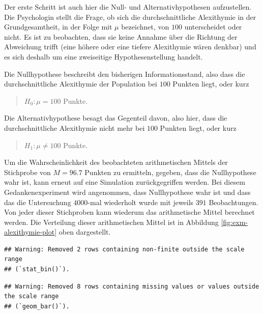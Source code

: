 \documentclass[
]{book}
\theoremstyle{definition}
\theoremstyle{definition}
\theoremstyle{definition}
\theoremstyle{definition}
\theoremstyle{remark}
\begin{document}
Der erste Schritt ist auch hier die Null- und Alternativhypothesen aufzustellen. Die Psychologin stellt die Frage, ob sich die durchschnittliche Alexithymie in der Grundgesamtheit, in der Folge mit \(\mu\) bezeichnet, von \(100\) unterscheidet oder nicht. Es ist zu beobachten, dass sie keine Annahme über die Richtung der Abweichung trifft (eine höhere oder eine tiefere Alexithymie wären denkbar) und es sich deshalb um eine zweiseitige Hypothesenstellung handelt.

Die Nullhypothese beschreibt den bisherigen Informationsstand, also dass die durchschnittliche Alexithymie der Population bei \(100\) Punkten liegt, oder kurz

\begin{quote}
\(H_0:\mu = 100\) Punkte.
\end{quote}

Die Alternativhypothese besagt das Gegenteil davon, also hier, dass die durchschnittliche Alexithymie nicht mehr bei \(100\) Punkten liegt, oder kurz

\begin{quote}
\(H_1: \mu \neq 100\) Punkte.
\end{quote}

Um die Wahrscheinlichkeit des beobachteten arithmetischen Mittels der Stichprobe von \(M = 96.7\) Punkten zu ermitteln, gegeben, dass die Nullhypothese wahr ist, kann erneut auf eine Simulation zurückgegriffen werden. Bei diesem Gedankenexperiment wird angenommen, dass Nullhypothese wahr ist und dass das die Untersuchung \(4000\)-mal wiederholt wurde mit jeweils \(391\) Beobachtungen. Von jeder dieser Stichproben kann wiederum das arithmetische Mittel berechnet werden. Die Verteilung dieser arithmetischen Mittel ist in Abbildung \ref{fig:exm-alexithymie-plot} oben dargestellt.

\begin{verbatim}
## Warning: Removed 2 rows containing non-finite outside the scale range
## (`stat_bin()`).
\end{verbatim}

\begin{verbatim}
## Warning: Removed 8 rows containing missing values or values outside the scale range
## (`geom_bar()`).
\end{verbatim}
\end{document}
